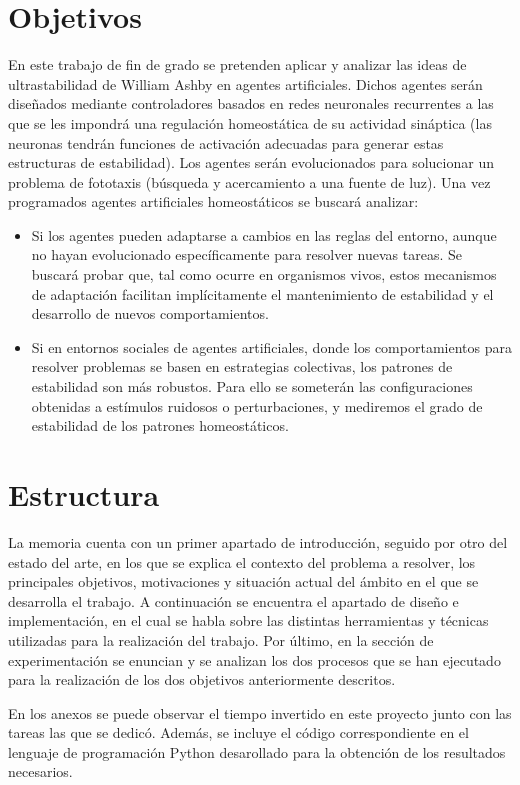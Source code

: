 \section{Objetivos}
En este trabajo de fin de grado se pretenden aplicar y analizar las ideas de
ultrastabilidad de William Ashby en agentes artificiales. Dichos agentes serán diseñados mediante controladores
basados en redes neuronales recurrentes a las que se les impondrá una regulación
homeostática de su actividad sináptica (las neuronas tendrán funciones de activación
adecuadas para generar estas estructuras de estabilidad). Los agentes serán evolucionados
para solucionar un problema de fototaxis (búsqueda y acercamiento a una fuente de luz).
Una vez programados agentes artificiales homeostáticos se buscará analizar:

\begin{itemize}
\item Si los agentes pueden adaptarse a cambios en las reglas del entorno, aunque no hayan
evolucionado específicamente para resolver nuevas tareas. Se buscará probar que, tal
como ocurre en organismos vivos, estos mecanismos de adaptación facilitan
implícitamente el mantenimiento de estabilidad y el desarrollo de nuevos
comportamientos.
\item  Si en entornos sociales de agentes artificiales, donde los comportamientos para resolver
problemas se basen en estrategias colectivas, los patrones de estabilidad son más
robustos. Para ello se someterán las configuraciones obtenidas a estímulos ruidosos o
perturbaciones, y mediremos el grado de estabilidad de los patrones homeostáticos.
\end{itemize}

\section{Estructura}
La memoria cuenta con un primer apartado de introducción, seguido por otro del estado del arte, en los que se explica el contexto del problema a resolver, los principales objetivos,
motivaciones y situación actual del ámbito en el que se desarrolla el trabajo. A continuación se encuentra el apartado de diseño e implementación, en el cual se habla sobre las distintas
herramientas y técnicas utilizadas para la realización del trabajo. Por último, en la sección de experimentación se enuncian y se analizan los dos procesos que se han ejecutado para la
realización de los dos objetivos anteriormente descritos.

En los anexos se puede observar el tiempo invertido en este proyecto junto con las tareas las que se dedicó. Además,
se incluye el código correspondiente en el lenguaje de programación Python desarollado para la obtención de los resultados necesarios.
